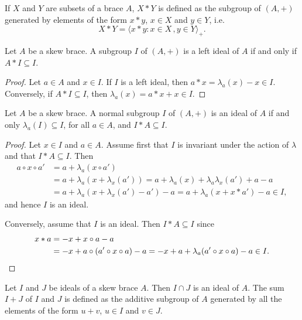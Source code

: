 If $X$ and $Y$ are subsets of a brace $A$, $X*Y$ is defined as the 
subgroup of $(A,+)$ generated by elements of the form $x*y$, $x\in X$ and $y\in Y$, i.e.
\[
X*Y=\langle x*y:x\in X\,,y\in Y\rangle_+.
\]

\begin{proposition}
    \label{pro:A*I}
    Let $A$ be a skew brace. A subgroup $I$ of $(A,+)$ is 
    a left ideal of $A$ if and only if $A*I\subseteq I$.
\end{proposition}

\begin{proof}
    Let $a\in A$ and $x\in I$. If $I$ is a
    left ideal, then $a*x=\lambda_a(x)-x\in I$. Conversely, if $A*I\subseteq
    I$, then $\lambda_a(x)=a*x+x\in I$.
\end{proof}

\begin{proposition}
    \label{pro:I*A}
    Let $A$ be a skew brace. A normal subgroup $I$ of $(A,+)$
    is an ideal of $A$ if and only $\lambda_a(I)\subseteq I$, for all $a\in A$, and
    $I*A\subseteq I$.
\end{proposition}

\begin{proof}
    Let $x\in I$ and $a\in A$.  Assume first that $I$ is invariant under the
    action of $\lambda$ and that $I*A\subseteq I$. Then
    \begin{equation}
    \label{eq:trick:I*A}
        \begin{aligned}
        a\circ x\circ a' &=a+\lambda_a(x\circ a')\\
        &=a+\lambda_a(x+\lambda_x(a'))
        =a+\lambda_a(x)+\lambda_a\lambda_x(a')+a-a\\
        &=a+\lambda_a(x+\lambda_x(a')-a')-a
        =a+\lambda_a(x+x*a')-a\in I,
    \end{aligned}
    \end{equation}
    and hence $I$ is an ideal.

    Conversely, assume that $I$ is an ideal. Then $I*A\subseteq I$ since
    \begin{align*}
        x*a&=-x+x\circ a-a\\
        &=-x+a\circ(a'\circ x\circ a)-a
        =-x+a+\lambda_a(a'\circ x\circ a)-a\in I.\qedhere
    \end{align*}
\end{proof}


Let $I$ and $J$ be ideals
of a skew brace $A$. Then $I\cap J$ is an ideal of $A$.  
The sum $I+J$ of $I$ and $J$ is defined as the
additive subgroup of $A$ generated by all the 
elements of the form
$u+v$, $u\in I$ and $v\in J$. 

